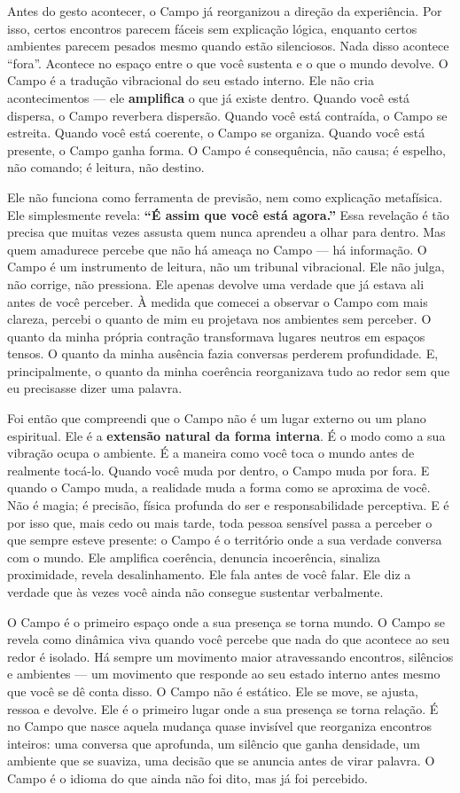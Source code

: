 \documentclass[12pt]{book}
\begin{document}
Antes do gesto acontecer, o Campo já reorganizou a direção da experiência. Por isso, certos encontros parecem fáceis sem explicação lógica, enquanto certos ambientes parecem pesados mesmo quando estão silenciosos. Nada disso acontece \enquote{fora}. Acontece no espaço entre o que você sustenta e o que o mundo devolve. O Campo é a tradução vibracional do seu estado interno. Ele não cria acontecimentos --- ele \textbf{amplifica} o que já existe dentro. Quando você está dispersa, o Campo reverbera dispersão. Quando você está contraída, o Campo se estreita. Quando você está coerente, o Campo se organiza. Quando você está presente, o Campo ganha forma. O Campo é consequência, não causa; é espelho, não comando; é leitura, não destino.

Ele não funciona como ferramenta de previsão, nem como explicação metafísica. Ele simplesmente revela: \textbf{\enquote{É assim que você está agora.}} Essa revelação é tão precisa que muitas vezes assusta quem nunca aprendeu a olhar para dentro. Mas quem amadurece percebe que não há ameaça no Campo --- há informação. O Campo é um instrumento de leitura, não um tribunal vibracional. Ele não julga, não corrige, não pressiona. Ele apenas devolve uma verdade que já estava ali antes de você perceber. À medida que comecei a observar o Campo com mais clareza, percebi o quanto de mim eu projetava nos ambientes sem perceber. O quanto da minha própria contração transformava lugares neutros em espaços tensos. O quanto da minha ausência fazia conversas perderem profundidade. E, principalmente, o quanto da minha coerência reorganizava tudo ao redor sem que eu precisasse dizer uma palavra.

Foi então que compreendi que o Campo não é um lugar externo ou um plano espiritual. Ele é a \textbf{extensão natural da forma interna}. É o modo como a sua vibração ocupa o ambiente. É a maneira como você toca o mundo antes de realmente tocá-lo. Quando você muda por dentro, o Campo muda por fora. E quando o Campo muda, a realidade muda a forma como se aproxima de você. Não é magia; é precisão, física profunda do ser e responsabilidade perceptiva. E é por isso que, mais cedo ou mais tarde, toda pessoa sensível passa a perceber o que sempre esteve presente: o Campo é o território onde a sua verdade conversa com o mundo. Ele amplifica coerência, denuncia incoerência, sinaliza proximidade, revela desalinhamento. Ele fala antes de você falar. Ele diz a verdade que às vezes você ainda não consegue sustentar verbalmente.

O Campo é o primeiro espaço onde a sua presença se torna mundo. O Campo se revela como dinâmica viva quando você percebe que nada do que acontece ao seu redor é isolado. Há sempre um movimento maior atravessando encontros, silêncios e ambientes --- um movimento que responde ao seu estado interno antes mesmo que você se dê conta disso. O Campo não é estático. Ele se move, se ajusta, ressoa e devolve. Ele é o primeiro lugar onde a sua presença se torna relação. É no Campo que nasce aquela mudança quase invisível que reorganiza encontros inteiros: uma conversa que aprofunda, um silêncio que ganha densidade, um ambiente que se suaviza, uma decisão que se anuncia antes de virar palavra. O Campo é o idioma do que ainda não foi dito, mas já foi percebido.
\end{document}
